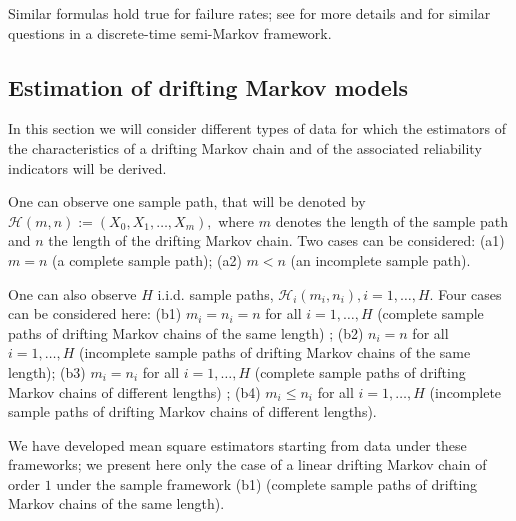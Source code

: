 \documentclass[article,nojss]{jss}\usepackage[]{graphicx}\usepackage[]{color}
\begin{document}
Similar formulas hold true for failure rates; see \cite{BaVe2018} for more details and \cite{Bar2004b,Bar2008b} for similar questions in a discrete-time semi-Markov framework.


\subsection{Estimation of drifting Markov models} \label{subsection_estimation}

In this section we will consider different types of data for which the estimators of the characteristics of a drifting Markov chain and of the associated reliability indicators  will be derived.

One can observe one sample path, that will be denoted by ${\mathcal H}(m,n):= (X_0,X_1, \ldots,X_{m}),$ where $m$ denotes the length of the sample path and $n$ the length of the drifting Markov chain. Two cases can be considered: (a1) $m=n$ (a complete sample path); (a2) $m < n$ (an incomplete sample path).

One can also observe $H$ i.i.d. sample paths, ${\mathcal H}_i(m_i,n_i), i=1, \ldots, H.$ Four cases can be considered here: (b1) $m_i=n_i=n$ for all $i=1, \ldots, H$ (complete sample paths of drifting Markov chains of the same length) ; (b2)  $n_i=n$  for all $i=1, \ldots, H$ (incomplete sample paths of drifting Markov chains of the same length); (b3) $m_i=n_i$ for all $i=1, \ldots, H$ (complete sample paths of drifting Markov chains of different lengths) ; (b4) $m_i \leq n_i$ for all $i=1, \ldots, H$ (incomplete sample paths of drifting Markov chains of different lengths).

We have developed \citep[cf.][]{Ver08,BaVe2018} mean square estimators starting from data under these frameworks; we present here only the case of a linear drifting Markov chain of order $1$ under the sample framework (b1) (complete sample paths of drifting Markov chains of the same length).
\end{document}
